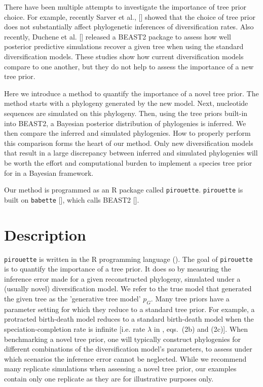 There have been multiple attempts to investigate the importance of tree
prior choice. For example, recently Sarver et al., [\cite{sarver2019choice}] 
showed that the choice of tree prior does not 
substantially affect phylogenetic inferences of diversification rates.
Also recently, Duchene et al. [\cite{duchene2018phylodynamic}] released
a BEAST2 package to assess how well posterior predictive simulations
recover a given tree when using the standard diversification models.
These studies show how current diversification models compare
to one another, but they do not help to assess 
the importance of a new tree prior. 

Here we introduce a method to quantify the importance of a novel tree prior.
The method starts with a phylogeny generated 
by the new model. 
Next, nucleotide sequences are simulated on this phylogeny. 
Then, using the tree priors built-in into BEAST2, 
a Bayesian posterior distribution of phylogenies is inferred. 
We then compare the inferred and simulated phylogenies. 
How to properly perform this comparison forms the heart of our method.
Only new diversification models that result 
in a large discrepancy between inferred and simulated phylogenies 
will be worth the effort and computational burden 
to implement a species tree prior for in a Bayesian framework.

Our method is programmed as an R package called \verb;pirouette;.
\verb;pirouette; is built on \verb;babette; [\cite{bilderbeek2018babette}], 
which calls BEAST2 [\cite{bouckaert2019beast}]. 

\section{Description}

\verb;pirouette; is written in the R programming language (\cite{R}).
The goal of \verb;pirouette; is to quantify the importance of a tree prior.
It does so by measuring the inference error made 
for a given reconstructed phylogeny, 
simulated under a (usually novel) diversification model.
We refer to the true model that generated the given tree
as the 'generative tree model' $\mathit{p_{G}}$.
Many tree priors have a parameter setting 
for which they reduce to a standard tree prior. 
For example, a protracted birth-death model \citep{etienne2012prolonging} 
reduces to a standard birth-death model when the speciation-completion rate 
is infinite [i.e. rate $\lambda$ in \cite{etienne2014estimating}, 
eqs.~(2b) and (2c)].
When benchmarking a novel tree prior, 
one will typically construct phylogenies 
for different combinations of the diversification model's parameters, 
to assess under which scenarios the inference error cannot be neglected. 
While we recommend many replicate simulations 
when assessing a novel tree prior, 
our examples contain only one replicate 
as they are for illustrative purposes only.

